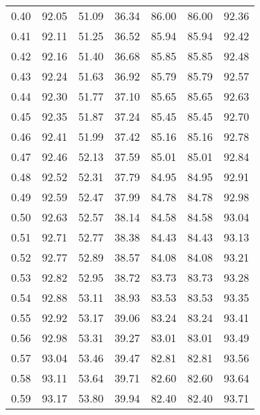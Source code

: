 \begin{tabular}{|c|c|c|c|c|c|c|}
      0.40 &     92.05 &     51.09 &      36.34 &   86.00 &      86.00 &         92.36 \\
      0.41 &     92.11 &     51.25 &      36.52 &   85.94 &      85.94 &         92.42 \\
      0.42 &     92.16 &     51.40 &      36.68 &   85.85 &      85.85 &         92.48 \\
      0.43 &     92.24 &     51.63 &      36.92 &   85.79 &      85.79 &         92.57 \\
      0.44 &     92.30 &     51.77 &      37.10 &   85.65 &      85.65 &         92.63 \\
      0.45 &     92.35 &     51.87 &      37.24 &   85.45 &      85.45 &         92.70 \\
      0.46 &     92.41 &     51.99 &      37.42 &   85.16 &      85.16 &         92.78 \\
      0.47 &     92.46 &     52.13 &      37.59 &   85.01 &      85.01 &         92.84 \\
      0.48 &     92.52 &     52.31 &      37.79 &   84.95 &      84.95 &         92.91 \\
      0.49 &     92.59 &     52.47 &      37.99 &   84.78 &      84.78 &         92.98 \\
      0.50 &     92.63 &     52.57 &      38.14 &   84.58 &      84.58 &         93.04 \\
      0.51 &     92.71 &     52.77 &      38.38 &   84.43 &      84.43 &         93.13 \\
      0.52 &     92.77 &     52.89 &      38.57 &   84.08 &      84.08 &         93.21 \\
      0.53 &     92.82 &     52.95 &      38.72 &   83.73 &      83.73 &         93.28 \\
      0.54 &     92.88 &     53.11 &      38.93 &   83.53 &      83.53 &         93.35 \\
      0.55 &     92.92 &     53.17 &      39.06 &   83.24 &      83.24 &         93.41 \\
      0.56 &     92.98 &     53.31 &      39.27 &   83.01 &      83.01 &         93.49 \\
      0.57 &     93.04 &     53.46 &      39.47 &   82.81 &      82.81 &         93.56 \\
      0.58 &     93.11 &     53.64 &      39.71 &   82.60 &      82.60 &         93.64 \\
      0.59 &     93.17 &     53.80 &      39.94 &   82.40 &      82.40 &         93.71 \\

\end{tabular}
